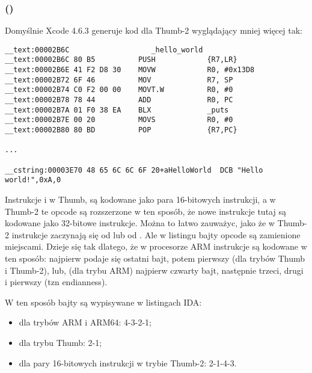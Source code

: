 \subsubsection{\OptimizingXcodeIV (\ThumbTwoMode)}

Domyślnie Xcode 4.6.3 generuje kod dla Thumb-2 wyglądający mniej więcej tak:

\begin{lstlisting}[caption=\OptimizingXcodeIV (\ThumbTwoMode),style=customasmARM]
__text:00002B6C                   _hello_world
__text:00002B6C 80 B5          PUSH            {R7,LR}
__text:00002B6E 41 F2 D8 30    MOVW            R0, #0x13D8
__text:00002B72 6F 46          MOV             R7, SP
__text:00002B74 C0 F2 00 00    MOVT.W          R0, #0
__text:00002B78 78 44          ADD             R0, PC
__text:00002B7A 01 F0 38 EA    BLX             _puts
__text:00002B7E 00 20          MOVS            R0, #0
__text:00002B80 80 BD          POP             {R7,PC}

...

__cstring:00003E70 48 65 6C 6C 6F 20+aHelloWorld  DCB "Hello world!",0xA,0
\end{lstlisting}


\myindex{\ThumbTwoMode}
Instrukcje  i  w Thumb, są kodowane jako para 16-bitowych instrukcji, 
a w Thumb-2 te opcode są rozszerzone w ten sposób, że nowe instrukcje tutaj są kodowane jako 32-bitowe instrukcje.
Można to łatwo zauważyc, jako że w Thumb-2 instrukcje zaczynają się od  lub od .
Ale w listingu \IDA bajty opcode są zamienione miejscami.
Dzieje się tak dlatego, że w procesorze ARM instrukcje są kodowane w ten sposób:
najpierw podaje się ostatni bajt, potem pierwszy (dla trybów Thumb i Thumb-2), lub, 
(dla trybu ARM) najpierw czwarty bajt, następnie trzeci, drugi i pierwszy 
(tzn \gls{endianness}).

W ten sposób bajty są wypisywane w listingach IDA:

\begin{itemize}
\item dla trybów ARM i ARM64: 4-3-2-1;
\item dla trybu Thumb: 2-1;
\item dla pary 16-bitowych instrukcji w trybie Thumb-2: 2-1-4-3.
\end{itemize}

